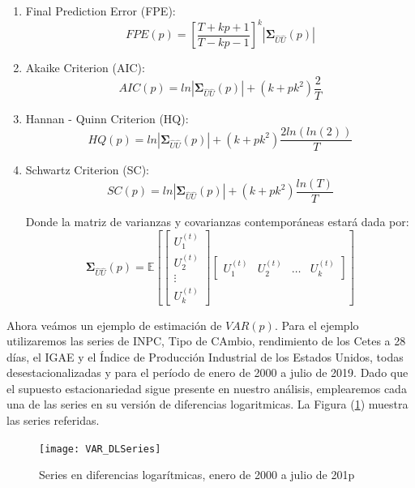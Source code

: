 \documentclass[
  a4paper,
]{article}
\begin{document}
\begin{enumerate}
    \item Final Prediction Error (FPE):
        $$
        FPE(p) = \left[ \frac{T + kp + 1}{T - kp - 1} \right]^k |\mathbf{\Sigma}_{\hat{U}\hat{U}}(p)|
        $$
    
    \item Akaike Criterion (AIC):
        $$
        AIC(p) = ln|\mathbf{\Sigma}_{\hat{U}\hat{U}}(p)| + (k + p k^2) \frac{2}{T}
        $$
    
    \item Hannan - Quinn Criterion (HQ):
        $$
        HQ(p) = ln|\mathbf{\Sigma}_{\hat{U}\hat{U}}(p)| + (k + p k^2) \frac{2ln(ln(2))}{T}
        $$
    
    \item Schwartz Criterion (SC):
        $$
        SC(p) = ln|\mathbf{\Sigma}_{\hat{U}\hat{U}}(p)| + (k + p k^2) \frac{ln(T)}{T}
        $$
        
        Donde la matriz de varianzas y covarianzas contemporáneas estará dada por:
        \begin{equation*}
            \mathbf{\Sigma}_{\hat{U}\hat{U}}(p) = \mathbb{E} \left[
            \begin{bmatrix}
            U^{(t)}_{1} \\ U^{(t)}_{2} \\ \vdots \\ U^{(t)}_{k}
            \end{bmatrix}
            \begin{bmatrix}
            U^{(t)}_{1} & U^{(t)}_{2} & \ldots & U^{(t)}_{k}
            \end{bmatrix}
            \right]
        \end{equation*}
\end{enumerate}

Ahora veámos un ejemplo de estimación de \(VAR(p)\). Para el ejemplo
utilizaremos las series de INPC, Tipo de CAmbio, rendimiento de los
Cetes a 28 días, el IGAE y el Índice de Producción Industrial de los
Estados Unidos, todas desestacionalizadas y para el período de enero de
2000 a julio de 2019. Dado que el supuesto estacionariedad sigue
presente en nuestro análisis, emplearemos cada una de las series en su
versión de diferencias logaritmicas. La Figura (\ref{VAR_DLSeries})
muestra las series referidas.

\begin{figure}
  \centering
    \texttt{[image: VAR\_DLSeries]}
  \caption{Series en diferencias logarítmicas, enero de 2000 a julio de 201p}
  \label{VAR_DLSeries}
\end{figure}
\end{document}
